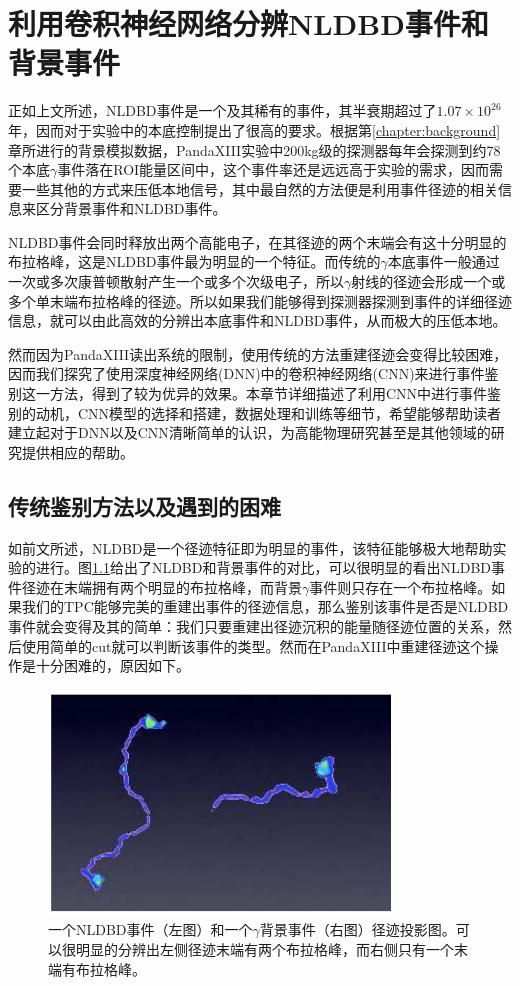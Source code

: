 
\chapter{利用卷积神经网络分辨NLDBD事件和背景事件}
\label{chapter:cnn}

正如上文所述，NLDBD事件是一个及其稀有的事件，其半衰期超过了$1.07\times10^{26}$年，因而对于实验中的本底控制提出了很高的要求。根据第\ref{chapter:background}章所进行的背景模拟数据，PandaXIII实验中200kg级的探测器每年会探测到约78个本底$\gamma$事件落在ROI能量区间中，这个事件率还是远远高于实验的需求，因而需要一些其他的方式来压低本地信号，其中最自然的方法便是利用事件径迹的相关信息来区分背景事件和NLDBD事件。

NLDBD事件会同时释放出两个高能电子，在其径迹的两个末端会有这十分明显的布拉格峰，这是NLDBD事件最为明显的一个特征。而传统的$\gamma$本底事件一般通过一次或多次康普顿散射产生一个或多个次级电子，所以$\gamma$射线的径迹会形成一个或多个单末端布拉格峰的径迹。所以如果我们能够得到探测器探测到事件的详细径迹信息，就可以由此高效的分辨出本底事件和NLDBD事件，从而极大的压低本地。

然而因为PandaXIII读出系统的限制，使用传统的方法重建径迹会变得比较困难，因而我们探究了使用深度神经网络(DNN)中的卷积神经网络(CNN)来进行事件鉴别这一方法，得到了较为优异的效果。本章节详细描述了利用CNN中进行事件鉴别的动机，CNN模型的选择和搭建，数据处理和训练等细节，希望能够帮助读者建立起对于DNN以及CNN清晰简单的认识，为高能物理研究甚至是其他领域的研究提供相应的帮助。

\section{传统鉴别方法以及遇到的困难}

如前文所述，NLDBD是一个径迹特征即为明显的事件，该特征能够极大地帮助实验的进行。图\ref{fig:samples}给出了NLDBD和背景事件的对比，可以很明显的看出NLDBD事件径迹在末端拥有两个明显的布拉格峰，而背景$\gamma$事件则只存在一个布拉格峰。如果我们的TPC能够完美的重建出事件的径迹信息，那么鉴别该事件是否是NLDBD事件就会变得及其的简单：我们只要重建出径迹沉积的能量随径迹位置的关系，然后使用简单的cut就可以判断该事件的类型。然而在PandaXIII中重建径迹这个操作是十分困难的，原因如下。

\begin{figure}[hbt]
    \centering
    \includegraphics[width=0.5\columnwidth]{pic/fig10.png}
    \caption{一个NLDBD事件（左图）和一个$\gamma$背景事件（右图）径迹投影图。可以很明显的分辨出左侧径迹末端有两个布拉格峰，而右侧只有一个末端有布拉格峰。}
    \label{fig:samples}
\end{figure}


